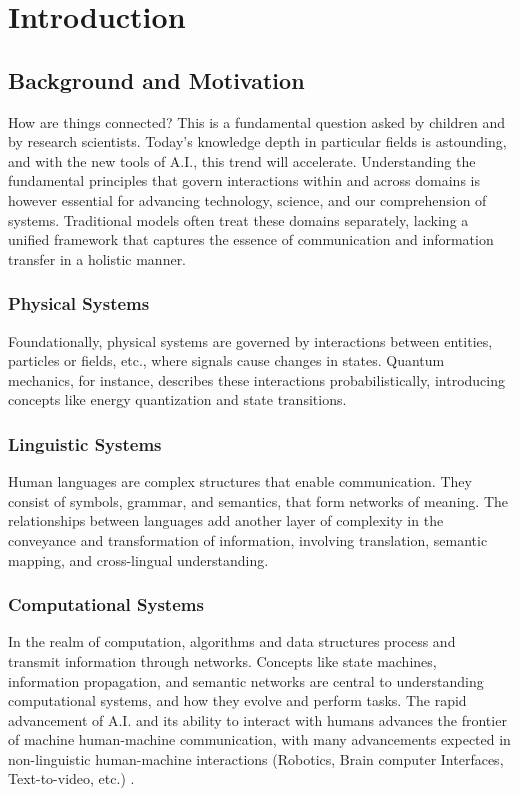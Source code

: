 
\section{Introduction}

\subsection{Background and Motivation}

How are things connected? This is a fundamental question asked by children and by research scientists. Today's knowledge depth in particular fields is astounding, and with the new tools of A.I., this trend will accelerate. Understanding the fundamental principles that govern interactions within and across domains is however essential for advancing technology, science, and our comprehension of systems. Traditional models often treat these domains separately, lacking a unified framework that captures the essence of communication and information transfer in a holistic manner.

\subsubsection{Physical Systems}

Foundationally, physical systems are governed by interactions between entities, particles or fields, etc., where signals cause changes in states. Quantum mechanics, for instance, describes these interactions probabilistically, introducing concepts like energy quantization and state transitions.

\subsubsection{Linguistic Systems}

Human languages are complex structures that enable communication. They consist of symbols, grammar, and semantics, that form networks of meaning. The relationships between languages add another layer of complexity in the conveyance and transformation of information, involving translation, semantic mapping, and cross-lingual understanding.

\subsubsection{Computational Systems}

In the realm of computation, algorithms and data structures process and transmit information through networks. Concepts like state machines, information propagation, and semantic networks are central to understanding computational systems, and how they evolve and perform tasks. The rapid advancement of A.I. and its ability to interact with humans advances the frontier of machine human-machine communication, with many advancements expected in non-linguistic human-machine interactions (Robotics, Brain computer Interfaces, Text-to-video, etc.) .

